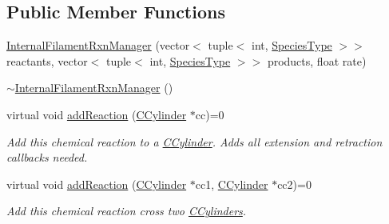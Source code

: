 \subsection*{Public Member Functions}
\begin{DoxyCompactItemize}
\item 
\hyperlink{classInternalFilamentRxnManager_a2972bf77f48cada1ef30d8420924834e}{Internal\+Filament\+Rxn\+Manager} (vector$<$ tuple$<$ int, \hyperlink{Species_8h_a50651af47c56ea0e27235468d23542cf}{Species\+Type} $>$$>$ reactants, vector$<$ tuple$<$ int, \hyperlink{Species_8h_a50651af47c56ea0e27235468d23542cf}{Species\+Type} $>$$>$ products, float rate)
\item 
\hyperlink{classInternalFilamentRxnManager_aa779e524843d4d45fa81002a64a0964e}{$\sim$\+Internal\+Filament\+Rxn\+Manager} ()
\item 
virtual void \hyperlink{classInternalFilamentRxnManager_a45f1ff9c676e41db408669ab6c5242e9}{add\+Reaction} (\hyperlink{classCCylinder}{C\+Cylinder} $\ast$cc)=0
\begin{DoxyCompactList}\small\item\em Add this chemical reaction to a \hyperlink{classCCylinder}{C\+Cylinder}. Adds all extension and retraction callbacks needed. \end{DoxyCompactList}\item 
virtual void \hyperlink{classInternalFilamentRxnManager_ac8152bcd9f6aa5d69f85a98cff86d2b0}{add\+Reaction} (\hyperlink{classCCylinder}{C\+Cylinder} $\ast$cc1, \hyperlink{classCCylinder}{C\+Cylinder} $\ast$cc2)=0
\begin{DoxyCompactList}\small\item\em Add this chemical reaction cross two \hyperlink{classCCylinder}{C\+Cylinders}. \end{DoxyCompactList}\end{DoxyCompactItemize}
